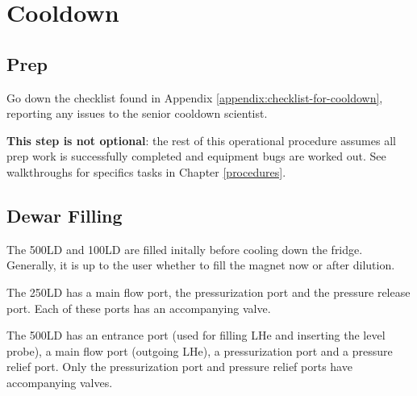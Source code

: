 \section{Cooldown}
\subsection{Prep}
\label{practical-op:prep}
Go down the checklist found in Appendix \ref{appendix:checklist-for-cooldown}, reporting any issues to the senior cooldown scientist.

\textbf{This step is not optional}: the rest of this operational procedure assumes all prep work is successfully completed and equipment bugs are worked out.  See walkthroughs for specifics tasks in Chapter \ref{procedures}.

\subsection{Dewar Filling}
The 500LD and 100LD are filled initally before cooling down the fridge.  Generally, it is up to the user whether to fill the magnet now or after dilution.

The 250LD has a main flow port, the pressurization port and the pressure release port.  Each of these ports has an accompanying valve.

The 500LD has an entrance port (used for filling LHe and inserting the level probe), a main flow port (outgoing LHe), a pressurization port and a pressure relief port.  Only the pressurization port and pressure relief ports have accompanying valves.

